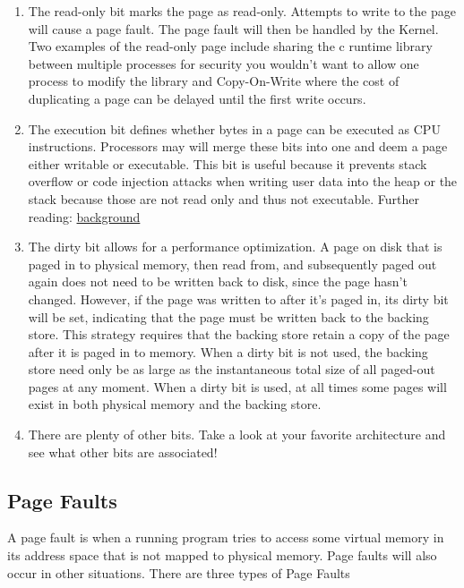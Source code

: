 \begin{enumerate}
\item The read-only bit marks the page as read-only.
Attempts to write to the page will cause a page fault.
The page fault will then be handled by the Kernel.
Two examples of the read-only page include sharing the c runtime library between multiple processes for security you wouldn't want to allow one process to modify the library and Copy-On-Write where the cost of duplicating a page can be delayed until the first write occurs.

\item The execution bit defines whether bytes in a page can be executed as CPU instructions.
Processors may will merge these bits into one and deem a page either writable or executable.
This bit is useful because it prevents stack overflow or code injection attacks when writing user data into the heap or the stack because those are not read only and thus not executable.
Further reading: \href{http://en.wikipedia.org/wiki/NX\_bit\#Hardware\_background}{background}

\item The dirty bit allows for a performance optimization.
A page on disk that is paged in to physical memory, then read from, and subsequently paged out again does not need to be written back to disk, since the page hasn't changed.
However, if the page was written to after it's paged in, its dirty bit will be set, indicating that the page must be written back to the backing store.
This strategy requires that the backing store retain a copy of the page after it is paged in to memory.
When a dirty bit is not used, the backing store need only be as large as the instantaneous total size of all paged-out pages at any moment.
When a dirty bit is used, at all times some pages will exist in both physical memory and the backing store.
\item There are plenty of other bits. Take a look at your favorite architecture and see what other bits are associated!
\end{enumerate}

\subsection{Page Faults}

A page fault is when a running program tries to access some virtual memory in its address space that is not mapped to physical memory.
Page faults will also occur in other situations.
There are three types of Page Faults

